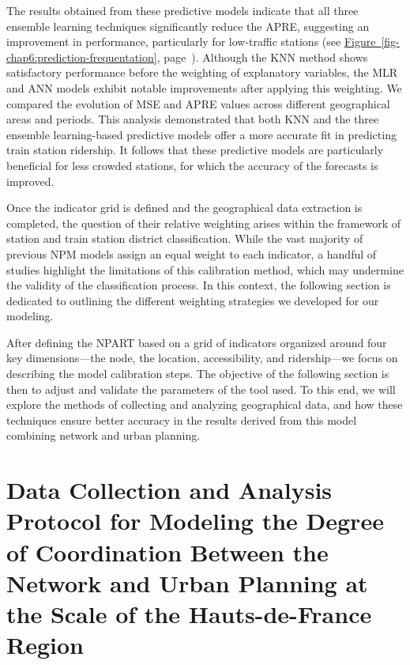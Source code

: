 \begin{refsegment}
The results obtained from these predictive models indicate that all three ensemble learning techniques significantly reduce the \acrshort{APRE}, suggesting an improvement in performance, particularly for low-traffic stations (see \hyperref[fig-chap6:prediction-frequentation]{Figure~\ref{fig-chap6:prediction-frequentation}}, page~\pageref{fig-chap6:prediction-frequentation}). Although the \acrshort{KNN} method shows satisfactory performance before the weighting of explanatory variables, the \acrshort{MLR} and \acrshort{ANN} models exhibit notable improvements after applying this weighting. We compared the evolution of \acrshort{MSE} and \acrshort{APRE} values across different geographical areas and periods. This analysis demonstrated that both \acrshort{KNN} and the three ensemble learning-based predictive models offer a more accurate fit in predicting train station ridership. It follows that these predictive models are particularly beneficial for less crowded stations, for which the accuracy of the forecasts is improved.

Once the indicator grid is defined and the geographical data extraction is completed, the question of their relative weighting arises within the framework of station and train station district classification. While the vast majority of previous \acrshort{NPM} models assign an equal weight to each indicator, a handful of studies highlight the limitations of this calibration method, which may undermine the validity of the classification process. In this context, the following section is dedicated to outlining the different weighting strategies we developed for our modeling.

After defining the \acrshort{NPART} based on a grid of indicators organized around four key dimensions—the node, the location, accessibility, and ridership—we focus on describing the model calibration steps. The objective of the following section is then to adjust and validate the parameters of the tool used. To this end, we will explore the methods of collecting and analyzing geographical data, and how these techniques ensure better accuracy in the results derived from this model combining network and urban planning.

\newpage
{} %
\section{Data Collection and Analysis Protocol for Modeling the Degree of Coordination Between the Network and Urban Planning at the Scale of the Hauts-de-France Region
    \label{chap6:methodologie-m-tod-index}
    }


\end{refsegment}
